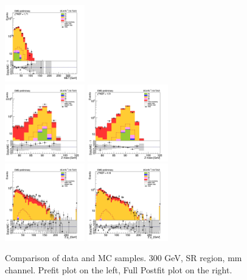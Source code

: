 \begin{figure}[tbp]
\begin{center}
    \includegraphics[width=0.31\textwidth]{figures/mm_300_SR_april21/met_pt_mm_SR_FullPostfit_plot_apr21.png}\\
    \includegraphics[width=0.31\textwidth]{figures/mm_300_SR_april21/zmass_mm_SR_prefit_plot_apr21.png}
    \includegraphics[width=0.31\textwidth]{figures/mm_300_SR_april21/zmass_mm_SR_FullPostfit_plot_apr21.png}\\
    \includegraphics[width=0.31\textwidth]{figures/mm_300_SR_april21/zpt0_mm_SR_prefit_plot_apr21.png}
    \includegraphics[width=0.31\textwidth]{figures/mm_300_SR_april21/zpt0_mm_SR_FullPostfit_plot_apr21.png}\\
    \caption{Comparison of data and MC samples. 300 GeV, SR region, mm channel. Prefit plot on the left,           Full Postfit plot on the right.}
    \label{fig:MCcomparisons_mm_low_SR_2}
  \end{center}
\end{figure}





